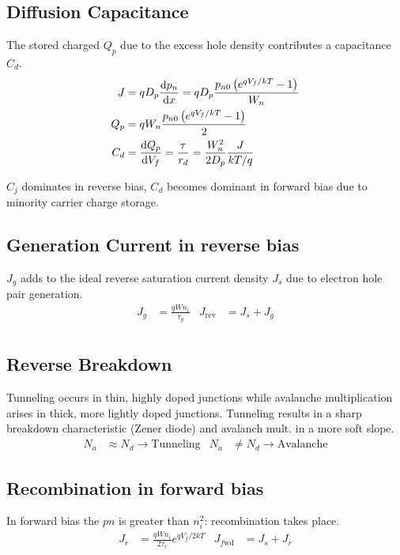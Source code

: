 \documentclass[a4paper, fontsize=8pt, landscape, DIV=1]{scrartcl}
\begin{document}
\begin{multicols*}{4}
    \subsection{Diffusion Capacitance}
    The stored charged $Q_p$ due to the excess hole density contributes a capacitance $C_d$.
    \begin{align*}
      J &= qD_p\frac{\mathrm{d}p_n}{\mathrm{d}x} = qD_p\frac{p_{n0}\left(e^{qV_f/kT}-1\right)}{W_n} \\
      Q_p &= qW_n\frac{p_{n0}\left(e^{qV_f/kT}-1\right)}{2} \\
      C_d &= \frac{\mathrm{d}Q_p}{\mathrm{d}V_f} = \frac{\tau}{r_d} = \frac{W_n^2}{2D_p}\frac{J}{kT/q}
    \end{align*}

    $C_j$ dominates in reverse bias, $C_d$ becomes dominant in forward bias due to minority carrier charge storage.


    \subsection{Generation Current in reverse bias}
    $J_g$ adds to the ideal reverse saturation current density $J_s$ due to electron hole pair generation.
    \begin{align*}
      J_g &= \frac{qWn_i}{\tau_g} & J_{\text{rev}} &= J_s + J_g\\
    \end{align*}

    \subsection{Reverse Breakdown}
    Tunneling occurs in thin, highly doped junctions while avalanche multiplication arises in thick, more lightly doped junctions.
    Tunneling results in a sharp breakdown characteristic (Zener diode) and avalanch mult. in a more soft slope.
    \begin{align*}
      N_a &\approx N_d \to \text{Tunneling} & N_a &\neq N_d \to \text{Avalanche}
    \end{align*}

    \subsection{Recombination in forward bias}
    In forward bias the $pn$ is greater than $n_i^2$: recombination takes place.
    \begin{align*}
      J_r &= \frac{qWn_i}{2\tau_r}e^{qV_f/2kT} & J_{f\text{wd}} &= J_s + J_r\\
    \end{align*}


\end{multicols*}
\end{document}
